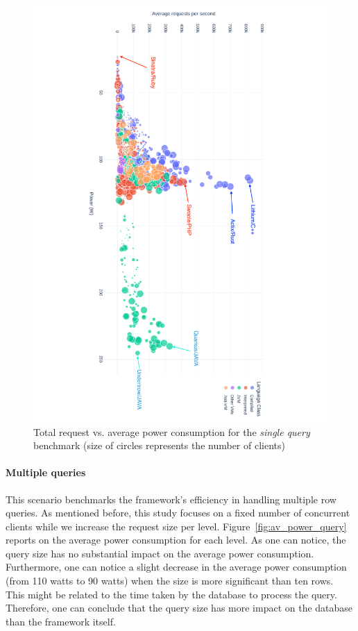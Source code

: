 \begin{figure}[hbt]
    \includegraphics[height=\textwidth,width=\textheight,keepaspectratio,angle=90]{imgs/power_requests_db}
    \caption{Total request vs. average power consumption for the \emph{single query} benchmark (size of circles represents the number of clients)}
    \label{fig:power_requests_db}
\end{figure}

\paragraph{Multiple queries}
This scenario benchmarks the framework's efficiency in handling multiple row queries.
As mentioned before, this study focuses on a fixed number of concurrent clients while we increase the request size per level.
Figure~\ref{fig:av_power_query} reports on the average power consumption for each level.
As one can notice, the query size has no substantial impact on the average power consumption.
Furthermore, one can notice a slight decrease in the average power consumption (from 110 watts to 90 watts) when the size is more significant than ten rows.
This might be related to the time taken by the database to process the query.
Therefore, one can conclude that the query size has more impact on the database than the framework itself.

